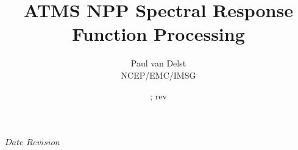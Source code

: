 

%


\SVN $Date$
\SVN $Revision$

\newcommand{\frequency}[1]{\ensuremath{f_{#1}}}
\newcommand{\bfrequency}[1]{\boldmath\frequency{#1}\unboldmath}
\newcommand{\bdf}[1]{\boldmath\df{#1}\unboldmath}
\newcommand{\sideband}[1]{\ensuremath{df_{#1}}}
\newcommand{\bsideband}[1]{\boldmath\sideband{#1}\unboldmath}
\newcommand{\bdeltaf}{\boldmath\ensuremath{\Delta f}\unboldmath}
\newcommand{\up}[1]{\superscript{#1}}

\title{ATMS NPP Spectral Response Function Processing}
\author{Paul van Delst\\NCEP/EMC/IMSG}
\date{\SVNDate ; rev\SVNRevision}



\maketitle

\draftwatermark

